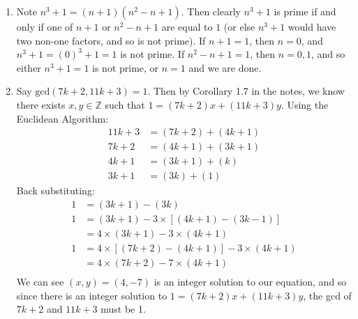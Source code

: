 \documentclass[10pt,english]{article}
\begin{document}
\begin{enumerate}
\pagebreak
\item Note $n^3+1=(n+1)(n^2-n+1)$. Then clearly $n^3+1$ is prime if and only if one of $n+1$ or $n^2-n+1$ are equal to $1$ (or else $n^3+1$ would have two non-one factors, and so is not prime). If $n+1=1$, then $n=0$, and $n^3+1=(0)^3+1=1$ is not prime. If $n^2-n+1=1$, then $n=0,1$, and so either $n^3+1=1$ is not prime, or $n=1$ and we are done. 

\pagebreak
\item Say $\text{gcd}(7k+2,11k+3)=1$. Then by Corollary 1.7 in the notes, we know there exists $x,y\in\mathbb{Z}$ such that $1=(7k+2)x+(11k+3)y$. Using the Euclidean Algorithm: 
\begin{align*}
11k+3&=(7k+2)+(4k+1)\\ 
7k+2&=(4k+1)+(3k+1)\\
4k+1&=(3k+1)+(k)\\
3k+1&=(3k)+(1)
\end{align*}
Back substituting: 
\begin{align*}
1&=(3k+1)-(3k) \\ 
1&=(3k+1)-3\times[(4k+1)-(3k-1)]\\
&=4\times(3k+1)-3\times(4k+1) \\ 
1&=4\times[(7k+2)-(4k+1)]-3\times(4k+1)\\ 
&=4\times(7k+2)-7\times(4k+1)\\
\end{align*}
We can see $(x,y)=(4,-7)$ is an integer solution to our equation, and so since there is an integer solution to $1=(7k+2)x+(11k+3)y$, the gcd of $7k+2$ and $11k+3$ must be 1. 


\end{enumerate}
\end{document}
